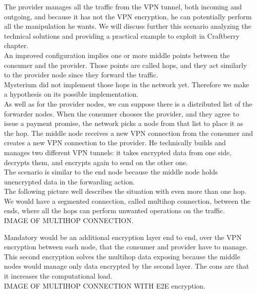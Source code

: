 \documentclass[12pt]{article}
\begin{document}
	The provider manages all the traffic from the VPN tunnel, both incoming and outgoing, and because it has not the VPN encryption, he can potentially perform all the manipulation he wants. We will discuss further this scenario analyzing the technical solutions and providing a practical example to exploit in Craftberry chapter.\\
	An improved configuration implies one or more middle points between the consumer and the provider. Those points are called hops, and they act similarly to the provider node since they forward the traffic.\\
	Mysterium did not implement those hops in the network yet. Therefore we make a hypothesis on its possible implementation.\\
	As well as for the provider nodes, we can suppose there is a distributed list of the forwarder nodes. When the consumer chooses the provider, and they agree to issue a payment promise, the network picks a node from that list to place it as the hop. The middle node receives a new VPN connection from the consumer and creates a new VPN connection to the provider. He technically builds and manages two different VPN tunnels: it takes encrypted data from one side, decrypts them, and encrypts again to send on the other one.\\
	The scenario is similar to the end node because the middle node holds unencrypted data in the forwarding action.\\
	The following picture well describes the situation with even more than one hop. We would have a segmented connection, called multihop connection, between the ends, where all the hops can perform unwanted operations on the traffic.\\
	
	\bigbreak
	IMAGE OF MULTIHOP CONNECTION.\\
	\bigbreak
	
	Mandatory would be an additional encryption layer end to end, over the VPN encryption between each node, that the consumer and provider have to manage. This second encryption solves the multihop data exposing because the middle nodes would manage only data encrypted by the second layer. The cons are that it increases the computational load.\\

	\bigbreak
	IMAGE OF MULTIHOP CONNECTION WITH E2E encryption.\\
	\bigbreak	
\end{document}
